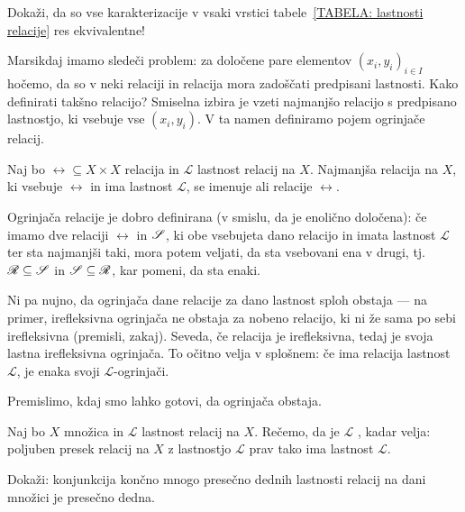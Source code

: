 		\begin{vaja}
			Dokaži, da so vse karakterizacije v vsaki vrstici tabele~\ref{TABELA: lastnosti relacije} res ekvivalentne!
		\end{vaja}
		
		Marsikdaj imamo sledeči problem: za določene pare elementov $(x_i, y_i)_{i \in I}$ hočemo, da so v neki relaciji in relacija mora zadoščati predpisani lastnosti. Kako definirati takšno relacijo? Smiselna izbira je vzeti najmanjšo relacijo s predpisano lastnostjo, ki vsebuje vse $(x_i, y_i)$. V ta namen definiramo pojem ogrinjače relacij.
		
		\begin{definicija}
			Naj bo $\rel \subseteq X \times X$ relacija in $\mathscr{L}$ lastnost relacij na $X$. Najmanjša relacija na $X$, ki vsebuje $\rel$ in ima lastnost $\mathscr{L}$, se imenuje  ali  relacije $\rel$.
		\end{definicija}
		
		Ogrinjača relacije je dobro definirana (v smislu, da je enolično določena): če imamo dve relaciji $\rel$ in $\srel$, ki obe vsebujeta dano relacijo in imata lastnost $\mathscr{L}$ ter sta najmanjši taki, mora potem veljati, da sta vsebovani ena v drugi, tj.~$\rel \subseteq \srel$ in $\srel \subseteq \rel$, kar pomeni, da sta enaki.
		
		Ni pa nujno, da ogrinjača dane relacije za dano lastnost sploh obstaja --- na primer, irefleksivna ogrinjača ne obstaja za nobeno relacijo, ki ni že sama po sebi irefleksivna (premisli, zakaj). Seveda, če relacija je irefleksivna, tedaj je svoja lastna irefleksivna ogrinjača. To očitno velja v splošnem: če ima relacija lastnost $\mathscr{L}$, je enaka svoji $\mathscr{L}$-ogrinjači.
		
		Premislimo, kdaj smo lahko gotovi, da ogrinjača obstaja.
		
		\begin{definicija}
			Naj bo $X$ množica in $\mathscr{L}$ lastnost relacij na $X$. Rečemo, da je $\mathscr{L}$ , kadar velja: poljuben presek relacij na $X$ z lastnostjo $\mathscr{L}$ prav tako ima lastnost $\mathscr{L}$.
		\end{definicija}
		
		\begin{vaja}\label{VAJA: presečna dednost zaprta za konjunkcije}
			Dokaži: konjunkcija končno mnogo presečno dednih lastnosti relacij na dani množici je presečno dedna.
		\end{vaja}
		
